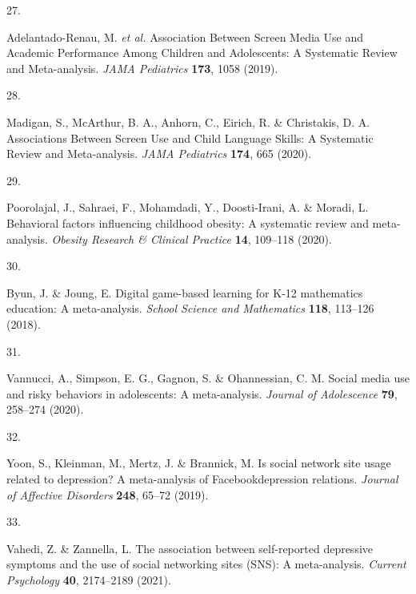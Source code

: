 \documentclass[
  english,
  man]{apa6}
\newlength{\cslhangindent}
\newlength{\csllabelwidth}
\newenvironment{CSLReferences}[2] %
 {%
  \setlength{\parindent}{0pt}
  \ifodd #1 \everypar{\setlength{\hangindent}{\cslhangindent}}\ignorespaces\fi
  \ifnum #2 > 0
  \setlength{\parskip}{#2\baselineskip}
  \fi
 }%
 {}
\newcommand{\CSLLeftMargin}[1]{\parbox[t]{\csllabelwidth}{#1}}
\newcommand{\CSLRightInline}[1]{\parbox[t]{\linewidth - \csllabelwidth}{#1}\break}
\begin{document}
\begin{CSLReferences}{0}{0}
\leavevmode{}%
\CSLLeftMargin{27. }
\CSLRightInline{Adelantado-Renau, M. \emph{et al.} Association {Between Screen Media Use} and {Academic Performance Among Children} and {Adolescents}: {A Systematic Review} and {Meta-analysis}. \emph{JAMA Pediatrics} \textbf{173}, 1058 (2019).}

\leavevmode{}%
\CSLLeftMargin{28. }
\CSLRightInline{Madigan, S., McArthur, B. A., Anhorn, C., Eirich, R. \& Christakis, D. A. Associations {Between Screen Use} and {Child Language Skills}: {A Systematic Review} and {Meta-analysis}. \emph{JAMA Pediatrics} \textbf{174}, 665 (2020).}

\leavevmode{}%
\CSLLeftMargin{29. }
\CSLRightInline{Poorolajal, J., Sahraei, F., Mohamdadi, Y., Doosti-Irani, A. \& Moradi, L. Behavioral factors influencing childhood obesity: A systematic review and meta-analysis. \emph{Obesity Research \& Clinical Practice} \textbf{14}, 109--118 (2020).}

\leavevmode{}%
\CSLLeftMargin{30. }
\CSLRightInline{Byun, J. \& Joung, E. Digital game-based learning for {K-12} mathematics education: {A} meta-analysis. \emph{School Science and Mathematics} \textbf{118}, 113--126 (2018).}

\leavevmode{}%
\CSLLeftMargin{31. }
\CSLRightInline{Vannucci, A., Simpson, E. G., Gagnon, S. \& Ohannessian, C. M. Social media use and risky behaviors in adolescents: {A} meta-analysis. \emph{Journal of Adolescence} \textbf{79}, 258--274 (2020).}

\leavevmode{}%
\CSLLeftMargin{32. }
\CSLRightInline{Yoon, S., Kleinman, M., Mertz, J. \& Brannick, M. Is social network site usage related to depression? {A} meta-analysis of {Facebook}\textendash depression relations. \emph{Journal of Affective Disorders} \textbf{248}, 65--72 (2019).}

\leavevmode{}%
\CSLLeftMargin{33. }
\CSLRightInline{Vahedi, Z. \& Zannella, L. The association between self-reported depressive symptoms and the use of social networking sites ({SNS}): {A} meta-analysis. \emph{Current Psychology} \textbf{40}, 2174--2189 (2021).}


\end{CSLReferences}
\end{document}
